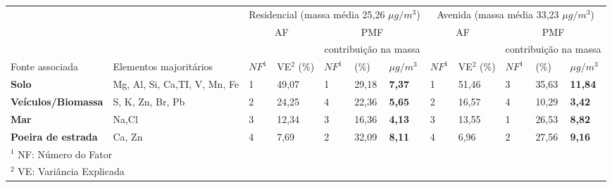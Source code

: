 \begin{tabular}{llll|lll|ll|lll}
\hline
                                                  &                        & \multicolumn{5}{c|}{Residencial (massa média 25,26 $\mu g / m^3$)} & \multicolumn{5}{c}{Avenida (massa média 33,23 $\mu g / m^3$)}    \\
                                                  &                        & \multicolumn{2}{c}{AF}      & \multicolumn{3}{c|}{PMF}              & \multicolumn{2}{c}{AF}                    & \multicolumn{3}{c}{PMF}          \\
\hline
 & & & & \multicolumn{3}{c|}{contribuição na massa} & & & \multicolumn{3}{c}{contribuição na massa} \\
Fonte associada                                   & Elementos majoritários & $NF^1$   & VE$^2$ (\%)               & $NF^1$   & (\%)   & $\mu g / m^3$  & $NF^1$       & VE$^2$  (\%)            & $NF^1$ & (\%)  & $\mu g / m^3$ \\
\hline
\textbf{Solo}                                                    & Mg, Al, Si, Ca,TI, V, Mn, Fe & 1  & 49,07               & 1      & 29,18 & \textbf{7,37} & 1  & 51,46               & 3      & 35,63 & \textbf{11,84} \\
\textbf{Veículos/Biomassa} & S, K, Zn, Br, Pb             & 2  & 24,25               & 4      & 22,36 & \textbf{5,65} & 2  & 16,57               & 4      & 10,29 & \textbf{3,42}  \\
\textbf{Mar}                                                     & Na,Cl                        & 3  & 12,34               & 3      & 16,36 & \textbf{4,13} & 3  & 13,55               & 1      & 26,53 & \textbf{8,82}  \\
\textbf{Poeira de estrada}                                       & Ca, Zn                       & 4  & 7,69                & 2      & 32,09 & \textbf{8,11} & 4  & 6,96                & 2      & 27,56 & \textbf{9,16}   \\ 

\hline
\multicolumn{12}{l}{$^1$ NF: Número do Fator} \\
\multicolumn{12}{l}{$^2$ VE: Variância Explicada} \\
\hline
\end{tabular}
